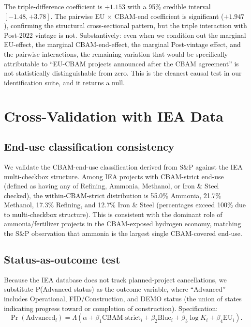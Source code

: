 \documentclass[11pt,a4paper]{article}
\begin{document}
The triple-difference coefficient is $+1.153$ with a 95\% credible interval $[-1.48, +3.78]$. The pairwise EU $\times$ CBAM-end coefficient is significant ($+1.947$), confirming the structural cross-sectional pattern, but the triple interaction with Post-2022 vintage is not. Substantively: even when we condition out the marginal EU-effect, the marginal CBAM-end-effect, the marginal Post-vintage effect, and the pairwise interactions, the remaining variation that would be specifically attributable to ``EU-CBAM projects announced after the CBAM agreement'' is not statistically distinguishable from zero. This is the cleanest causal test in our identification suite, and it returns a null.

\section{Cross-Validation with IEA Data}
\label{sec:ch8-iea-validation}

\subsection{End-use classification consistency}

We validate the CBAM-end-use classification derived from S\&P against the IEA multi-checkbox structure. Among IEA projects with CBAM-strict end-use (defined as having any of Refining, Ammonia, Methanol, or Iron \& Steel checked), the within-CBAM-strict distribution is 55.0\% Ammonia, 21.7\% Methanol, 17.3\% Refining, and 12.7\% Iron \& Steel (percentages exceed 100\% due to multi-checkbox structure). This is consistent with the dominant role of ammonia/fertilizer projects in the CBAM-exposed hydrogen economy, matching the S\&P observation that ammonia is the largest single CBAM-covered end-use.

\subsection{Status-as-outcome test}

Because the IEA database does not track planned-project cancellations, we substitute P(Advanced status) as the outcome variable, where ``Advanced'' includes Operational, FID/Construction, and DEMO status (the union of states indicating progress toward or completion of construction). Specification:
\begin{equation}
\Pr(\text{Advanced}_i) = \Lambda(\alpha + \beta_1 \text{CBAM-strict}_i + \beta_2 \text{Blue}_i + \beta_3 \log K_i + \beta_4 \text{EU}_i).
\end{equation}
\end{document}
